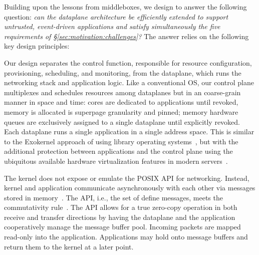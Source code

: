 
Building upon the lessons from middleboxes, we design \ix to answer
the following question: {\it can the dataplane architecture be
  efficiently extended to support untrusted, event-driven applications
  and satisfy simultaneously the five requirements of
  \S\ref{sec:motivation:challenges}?}  The answer relies on the
following key design principles:


Our design separates the control function, responsible for resource
configuration, provisioning, scheduling, and monitoring, from the
dataplane, which runs the networking stack and application logic.
Like a conventional OS, our control plane multiplexes and schedules
resources among dataplanes but in an coarse-grain manner in space and
time: cores are dedicated to applications until revoked, memory is
allocated is superpage granularity and pinned; memory hardware
queues are exclusively assigned to a single dataplane until explicitly revoked. 
Each dataplane runs a single application in a single address
space.  This is similar to the Exokernel approach of using library
operating systems~\cite{DBLP:conf/sosp/EnglerKO95}, but with the
additional protection between applications and the control plane using
the ubiquitous available hardware virtualization features in modern
servers~\cite{DBLP:journals/computer/UhligNRSMABKLS05,belay2012dune}.


 The kernel does
not expose or emulate the POSIX API for networking.  Instead, kernel
and application communicate asynchronously with each other via
messages stored in memory~\cite{rizzo2012netmap,han2012megapipe}.  The
API, i.e., the set of define messages, meets the commutativity rule~\cite{DBLP:conf/sosp/ClementsKZMK13}.
The API allows for a true zero-copy
operation in both receive and transfer directions by having the
dataplane and the application cooperatively manage the message buffer
pool.  Incoming packets are mapped read-only into the
application. Applications may hold onto message buffers and return
them to the kernel at a later point.

